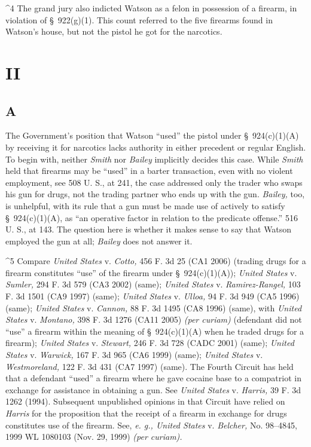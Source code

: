 ^4 The grand jury also indicted Watson as a felon in possession of a
firearm, in violation of \S~922(g)(1). This count referred to the five
firearms found in Watson's house, but not the pistol he got for the
narcotics.

\section{II}

\subsection{A}

  The Government's position that Watson ``used'' the pistol under
\S~924(c)(1)(A) by receiving it for narcotics lacks authority in either
precedent or regular English. To begin with, neither \emph{Smith} nor
\emph{Bailey} implicitly decides this case. While \emph{Smith} held that
firearms may be ``used'' in a barter transaction, even with no violent
employment, see 508 U. S., at 241, the case addressed only the
trader who swaps his gun for drugs, not the trading partner who ends
up with the gun. \emph{Bailey,} too, is unhelpful, with its rule that a
gun must be made use of actively to satisfy \S~924(c)(1)(A), as ``an
operative factor in relation to the predicate offense.'' 516 U. S.,
at 143. The question here is whether it makes sense to say that Watson
employed the gun at all; \emph{Bailey} does not answer it. \newpage 

^5 Compare \emph{United States} v. \emph{Cotto,} 456 F. 3d 25 (CA1 2006)
(trading drugs for a firearm constitutes ``use'' of the firearm under
\S~924(c)(1)(A)); \emph{United States} v. \emph{Sumler,} 294 F. 3d 579 (CA3
2002) (same); \emph{United States} v. \emph{Ramirez-Rangel,} 103 F. 3d 1501
(CA9 1997) (same); \emph{United States} v. \emph{Ulloa,} 94 F. 3d 949 (CA5
1996) (same); \emph{United States} v. \emph{Cannon,} 88 F. 3d 1495 (CA8 1996)
(same), with \emph{United States} v. \emph{Montano,} 398 F. 3d 1276 (CA11
2005) \emph{(per curiam)} (defendant did not ``use'' a firearm within
the meaning of \S~924(c)(1)(A) when he traded drugs for a firearm);
\emph{United States} v. \emph{Stewart,} 246 F. 3d 728 (CADC 2001) (same);
\emph{United States} v. \emph{Warwick,} 167 F. 3d 965 (CA6 1999) (same);
\emph{United States} v. \emph{Westmoreland,} 122 F. 3d 431 (CA7 1997) (same).
The Fourth Circuit has held that a defendant ``used'' a firearm where
he gave cocaine base to a compatriot in exchange for assistance in
obtaining a gun. See \emph{United States} v. \emph{Harris,} 39 F. 3d 1262
(1994). Subsequent unpublished opinions in that Circuit have relied on
\emph{Harris} for the proposition that the receipt of a firearm in exchange
for drugs constitutes use of the firearm. See, \emph{e. g., United States}
v. \emph{Belcher,} No. 98--4845, 1999 WL 1080103 (Nov. 29, 1999) \emph{(per
curiam).}



